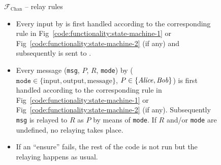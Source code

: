 
\begin{figure}[H]
  \begin{systembox}{$\mathcal{F}_{\mathrm{Chan}}$ -- relay rules}
    \begin{itemize}
      \item Every input by \environment is first handled according to the
      corresponding rule in Fig~\ref{code:functionality:state-machine-1} or
      Fig~\ref{code:functionality:state-machine-2} (if any) and subsequently is
      sent to \adversary.
      \item Every message (\texttt{msg}, $P$, $R$, \texttt{mode}) by \adversary
      ($\texttt{mode} \in \{\mathrm{input}, \mathrm{output},
      \mathrm{message}\}$, $P \in \{\mathit{Alice}, \mathit{Bob}\}$) is first handled according
      to the corresponding rule in Fig~\ref{code:functionality:state-machine-1}
      or Fig~\ref{code:functionality:state-machine-2} (if any).  Subsequently
      \texttt{msg} is relayed to $R$ as $P$ by means of \texttt{mode}. If $R$
      and/or \texttt{mode} are undefined, no relaying takes place.
      \item If an ``ensure'' fails, the rest of the code is not run but the
      relaying happens as usual.
    \end{itemize}
  \end{systembox}
  \caption{}
  \label{code:functionality:rules}
\end{figure}

